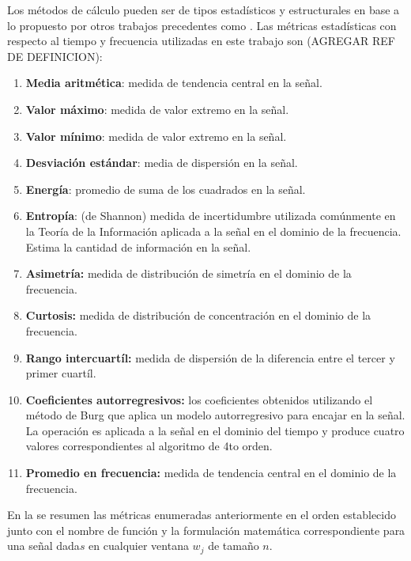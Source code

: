 Los métodos de cálculo pueden ser de tipos estadísticos y estructurales
\cite{LaraLabrador2013} en base a lo propuesto por otros trabajos
precedentes como \cite{Yang2009,Bao2004}. Las métricas estadísticas
con respecto al tiempo y frecuencia utilizadas en este trabajo son
(AGREGAR REF DE DEFINICION):
\begin{enumerate}
\item \textbf{Media aritmética}: medida de tendencia central en la señal.
\item \textbf{Valor máximo}: medida de valor extremo en la señal.
\item \textbf{Valor mínimo}: medida de valor extremo en la señal.
\item \textbf{Desviación estándar}: media de dispersión en la señal.
\item \textbf{Energía}: promedio de suma de los cuadrados en la señal.
\item \textbf{Entropía}: (de Shannon) medida de incertidumbre utilizada
comúnmente en la Teoría de la Información aplicada a la señal en el
dominio de la frecuencia. Estima la cantidad de información en la
señal.
\item \textbf{Asimetría:} medida de distribución de simetría en el dominio
de la frecuencia.
\item \textbf{Curtosis:} medida de distribución de concentración en el dominio
de la frecuencia.
\item \textbf{Rango intercuartíl:} medida de dispersión de la diferencia
entre el tercer y primer cuartíl.
\item \textbf{Coeficientes autorregresivos:} los coeficientes obtenidos
utilizando el método de Burg que aplica un modelo autorregresivo para
encajar en la señal. La operación es aplicada a la señal en el dominio
del tiempo y produce cuatro valores correspondientes al algoritmo
de 4to orden.
\item \textbf{Promedio en frecuencia:} medida de tendencia central en el
dominio de la frecuencia.
\end{enumerate}
En la  se resumen las métricas enumeradas anteriormente
en el orden establecido junto con el nombre de función y la formulación
matemática correspondiente para una señal dada$s$ en cualquier ventana
$w_{j}$ de tamaño $n$.

